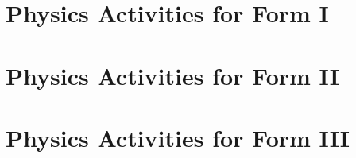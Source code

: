 \documentclass[10pt,a4paper,twoside]{report}
\begin{document}

%
%

\tableofcontents




\chapter{Physics Activities for Form I}
%
%
%
%
%
%
%
%
%

%
%
%
%
%
%
%


\chapter{Physics Activities for Form II}
%
%
%
%
%
%
%

%
%
%
%
%
%
%
%
%


\chapter{Physics Activities for Form III}
%

%



%
\end{document}
